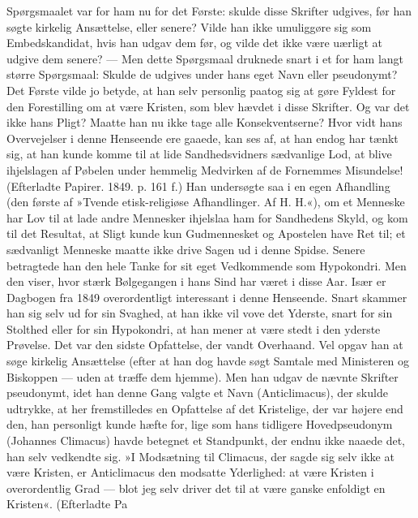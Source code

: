 \documentclass[12pt,a4paper,openany]{book}
\newcommand{\opage}[1]{\marginnote{\footnotesize\textit{[#1]}}}
\begin{document}
Spørgsmaalet var for ham nu for det Første: skulde
disse Skrifter udgives, før han søgte kirkelig Ansættelse,
eller senere? Vilde han ikke umuliggøre sig som Embedskandidat,
hvis han udgav dem før, og vilde det ikke
være uærligt at udgive dem senere? --- Men dette Spørgsmaal
druknede snart i et for ham langt større Spørgsmaal:
Skulde de udgives under hans eget Navn eller
pseudonymt? Det Første vilde jo betyde, at han selv
personlig paatog sig at gøre Fyldest for den Forestilling
om at være Kristen, som blev hævdet i disse Skrifter.
Og var det ikke hans Pligt? Maatte han nu ikke tage
\opage{133}alle Konsekventserne? Hvor vidt hans Overvejelser i
denne Henseende ere gaaede, kan ses af, at han endog
har tænkt sig, at han kunde komme til at lide Sandhedsvidners
sædvanlige Lod, at blive ihjelslagen af Pøbelen
under hemmelig Medvirken af de Fornemmes Misundelse!
(Efterladte Papirer. 1849. p. 161 f.) Han undersøgte saa
i en egen Afhandling (den første af »Tvende etisk-religiøse
Afhandlinger. Af H. H.«), om et Menneske har Lov til
at lade andre Mennesker ihjelslaa ham for Sandhedens
Skyld, og kom til det Resultat, at Sligt kunde kun Gudmennesket
og Apostelen have Ret til; et sædvanligt
Menneske maatte ikke drive Sagen ud i denne Spidse.
Senere betragtede han den hele Tanke for sit eget Vedkommende
som Hypokondri. Men den viser, hvor stærk
Bølgegangen i hans Sind har været i disse Aar. Især
er Dagbogen fra 1849 overordentligt interessant i denne
Henseende. Snart skammer han sig selv ud for sin
Svaghed, at han ikke vil vove det Yderste, snart for sin
Stolthed eller for sin Hypokondri, at han mener at være
stedt i den yderste Prøvelse. Det var den sidste Opfattelse,
der vandt Overhaand. Vel opgav han at søge
kirkelig Ansættelse (efter at han dog havde søgt Samtale
med Ministeren og Biskoppen --- uden at træffe dem
hjemme). Men han udgav de nævnte Skrifter pseudonymt,
idet han denne Gang valgte et Navn (Anticlimacus), der
skulde udtrykke, at her fremstilledes en Opfattelse af det
Kristelige, der var højere end den, han personligt kunde
hæfte for, lige som hans tidligere Hovedpseudonym (Johannes
Climacus) havde betegnet et Standpunkt, der endnu
ikke naaede det, han selv vedkendte sig. »I Modsætning
til Climacus, der sagde sig selv ikke at være Kristen,
er Anticlimacus den modsatte Yderlighed: at være
Kristen i overordentlig Grad --- blot jeg selv driver det
til at være ganske enfoldigt en Kristen«. (Efterladte Pa%
\end{document}

